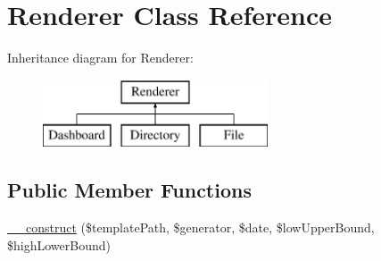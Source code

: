 \hypertarget{class_sebastian_bergmann_1_1_code_coverage_1_1_report_1_1_html_1_1_renderer}{}\section{Renderer Class Reference}
\label{class_sebastian_bergmann_1_1_code_coverage_1_1_report_1_1_html_1_1_renderer}
Inheritance diagram for Renderer\+:\begin{figure}[H]
\begin{center}
\leavevmode
\includegraphics[height=2.000000cm]{class_sebastian_bergmann_1_1_code_coverage_1_1_report_1_1_html_1_1_renderer}
\end{center}
\end{figure}
\subsection*{Public Member Functions}
\begin{DoxyCompactItemize}
\item 
\mbox{\hyperlink{class_sebastian_bergmann_1_1_code_coverage_1_1_report_1_1_html_1_1_renderer_a51e93af278248ccd1d16725b156b0a36}{\+\_\+\+\_\+construct}} (\$template\+Path, \$generator, \$date, \$low\+Upper\+Bound, \$high\+Lower\+Bound)
\end{DoxyCompactItemize}
